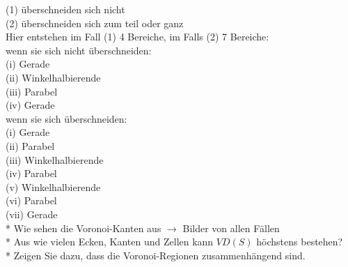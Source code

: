 (1) überschneiden sich nicht\\
(2) überschneiden sich zum teil oder ganz\\

Hier entstehen im Fall (1) 4 Bereiche, im Falls (2) 7 Bereiche:\\

wenn sie sich nicht überschneiden:\\
(i) Gerade\\
(ii) Winkelhalbierende\\
(iii) Parabel\\
(iv) Gerade\\

wenn sie sich überschneiden:\\
(i) Gerade\\
(ii) Parabel\\
(iii) Winkelhalbierende\\
(iv) Parabel\\
(v) Winkelhalbierende\\
(vi) Parabel\\
(vii) Gerade\\


* Wie sehen die Voronoi-Kanten aus $\rightarrow$ Bilder von allen Fällen\\
* Aus wie vielen Ecken, Kanten und Zellen kann $VD(S)$ höchstens bestehen?\\
* Zeigen Sie dazu, dass die Voronoi-Regionen zusammenhängend sind.